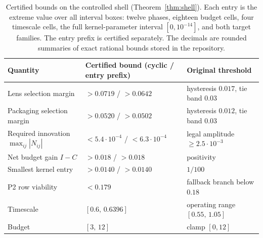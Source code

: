 \begin{table}[t]
\caption{Certified bounds on the controlled shell (Theorem~\ref{thm:shell}). Each entry is the extreme value over all interval boxes: twelve phases, eighteen budget cells, four timescale cells, the full kernel-parameter interval $[0,10^{-14}]$, and both target families. The entry prefix is certified separately. The decimals are rounded summaries of exact rational bounds stored in the repository.}
\label{tbl:shell-certificates}
\centering
\small
\begin{tabular}{@{}l l l@{}}
\toprule
Quantity & Certified bound (cyclic / entry prefix) & Original threshold \\
\midrule
Lens selection margin & $>0.0719$ / $>0.0642$ & hysteresis $0.017$, tie band $0.03$ \\
Packaging selection margin & $>0.0520$ / $>0.0502$ & hysteresis $0.012$, tie band $0.03$ \\
Required innovation $\max_{ij}|N_{ij}|$ & $<5.4\cdot10^{-4}$ / $<6.3\cdot10^{-4}$ & legal amplitude $\ge2.5\cdot10^{-3}$ \\
Net budget gain $I-C$ & $>0.018$ / $>0.018$ & positivity \\
Smallest kernel entry & $>0.0140$ / $>0.0140$ & $1/100$ \\
P2 row viability & $<0.179$ & fallback branch below $0.18$ \\
Timescale & $[0.6,\,0.6396]$ & operating range $[0.55,\,1.05]$ \\
Budget & $[3,\,12]$ & clamp $[0,12]$ \\
\bottomrule
\end{tabular}
\end{table}
